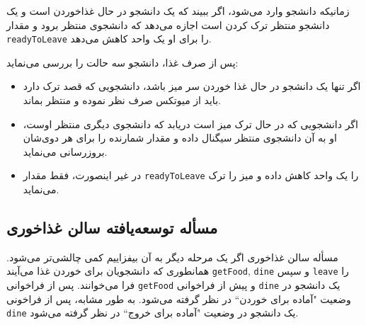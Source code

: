 \documentclass{book}
\begin{document}
    زمانیکه دانشجو وارد می‌شود، اگر ببیند که یک دانشجو در حال غذاخوردن است و یک دانشجو منتظر ترک کردن است اجازه می‌دهد که  دانشجوی منتظر 
    برود و مقدار  {\tt readyToLeave} را برای او یک واحد کاهش می‌دهد. 

\newpage
    پس از صرف غذا، دانشجو سه حالت را بررسی می‌نماید:

\begin{itemize}

\item %
    اگر تنها یک دانشجو در حال غذا خوردن سر میز باشد، دانشجویی که قصد ترک دارد باید از میوتکس صرف نظر نموده و منتظر بماند. 

\item %
    اگر دانشجویی که در حال ترک میز است دریابد که دانشجوی دیگری منتظر اوست، او به آن دانشجوی منتظر سیگنال داده و مقدار شمارنده را برای هر دوی‌شان
    بروزرسانی می‌نماید. 

\item %
    در غیر اینصورت، فقط مقدار  {\tt readyToLeave}  را یک واحد کاهش داده و میز را ترک می‌نماید.

\end{itemize}


\subsection{مسأله توسعه‌یافته سالن غذاخوری}

    مسأله سالن غذاخوری اگر یک مرحله دیگر به آن بیفزاییم کمی چالشی‌تر می‌شود. 
    همانطوری که دانشجویان برای خوردن غذا می‌آیند {\tt getFood}, {\tt dine}  و سپس {\tt leave} را فرا می‌خوانند. 
    پس از فراخوانی {\tt getFood}  و پیش از فراخوانی {\tt dine} یک دانشجو در وضعیت "آماده برای خوردن`` در نظر گرفته می‌شود. 
    به طور مشابه، پس از فراخونی {\tt dine} یک دانشجو در وضعیت "آماده برای خروج`` در نظر گرفته می‌شود. 
\end{document}
